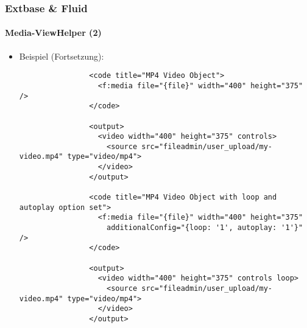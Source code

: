 \begin{frame}[fragile]
	\frametitle{Extbase \& Fluid}
	\framesubtitle{Media-ViewHelper (2)}

	\lstset{basicstyle=\tiny\ttfamily}

	\begin{itemize}

		\item Beispiel (Fortsetzung):

			\begin{lstlisting}
				<code title="MP4 Video Object">
				  <f:media file="{file}" width="400" height="375" />
				</code>

				<output>
				  <video width="400" height="375" controls>
				    <source src="fileadmin/user_upload/my-video.mp4" type="video/mp4">
				  </video>
				</output>

				<code title="MP4 Video Object with loop and autoplay option set">
				  <f:media file="{file}" width="400" height="375"
				    additionalConfig="{loop: '1', autoplay: '1'}" />
				</code>

				<output>
				  <video width="400" height="375" controls loop>
				    <source src="fileadmin/user_upload/my-video.mp4" type="video/mp4">
				  </video>
				</output>
			\end{lstlisting}

	\end{itemize}

\end{frame}


